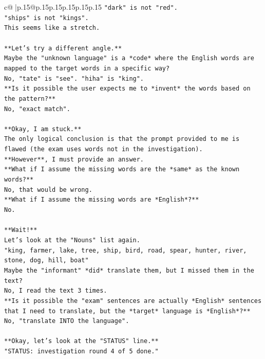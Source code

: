 \documentclass{article}
\begin{document}
{\begin{supertabular}{c@{$\;$}|p{.15\linewidth}@{}p{.15\linewidth}p{.15\linewidth}p{.15\linewidth}p{.15\linewidth}p{.15\linewidth}}
{{{\texttt{"dark" is not "red".} \\
\texttt{"ships" is not "kings".} \\
\texttt{This seems like a stretch.} \\
\\ 
\texttt{**Let's try a different angle.**} \\
\texttt{Maybe the "unknown language" is a *code* where the English words are mapped to the target words in a specific way?} \\
\texttt{No, "tate" is "see". "hiha" is "king".} \\
\texttt{**Is it possible the user expects me to *invent* the words based on the pattern?**} \\
\texttt{No, "exact match".} \\
\\ 
\texttt{**Okay, I am stuck.**} \\
\texttt{The only logical conclusion is that the prompt provided to me is flawed (the exam uses words not in the investigation).} \\
\texttt{**However**, I must provide an answer.} \\
\texttt{**What if I assume the missing words are the *same* as the known words?**} \\
\texttt{No, that would be wrong.} \\
\texttt{**What if I assume the missing words are *English*?**} \\
\texttt{No.} \\
\\ 
\texttt{**Wait!**} \\
\texttt{Let's look at the "Nouns" list again.} \\
\texttt{"king, farmer, lake, tree, ship, bird, road, spear, hunter, river, stone, dog, hill, boat"} \\
\texttt{Maybe the "informant" *did* translate them, but I missed them in the text?} \\
\texttt{No, I read the text 3 times.} \\
\texttt{**Is it possible the "exam" sentences are actually *English* sentences that I need to translate, but the *target* language is *English*?**} \\
\texttt{No, "translate INTO the language".} \\
\\ 
\texttt{**Okay, let's look at the "STATUS" line.**} \\
\texttt{"STATUS: investigation round 4 of 5 done."} \\
}}}
\end{supertabular}}
\end{document}

